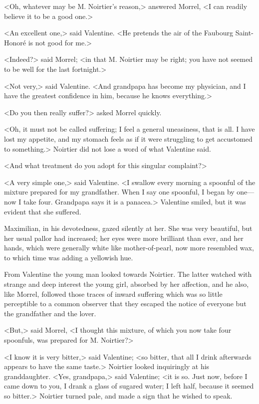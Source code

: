  <Oh, whatever may be M. Noirtier's reason,> answered Morrel, <I can readily believe it to be a good one.> 

 <An excellent one,> said Valentine. <He pretends the air of the Faubourg Saint-Honoré is not good for me.> 

 <Indeed?> said Morrel; <in that M. Noirtier may be right; you have not seemed to be well for the last fortnight.> 

 <Not very,> said Valentine. <And grandpapa has become my physician, and I have the greatest confidence in him, because he knows everything.> 

 <Do you then really suffer?> asked Morrel quickly. 

 <Oh, it must not be called suffering; I feel a general uneasiness, that is all. I have lost my appetite, and my stomach feels as if it were struggling to get accustomed to something.> Noirtier did not lose a word of what Valentine said. 

 <And what treatment do you adopt for this singular complaint?> 

 <A very simple one,> said Valentine. <I swallow every morning a spoonful of the mixture prepared for my grandfather. When I say one spoonful, I began by one—now I take four. Grandpapa says it is a panacea.> Valentine smiled, but it was evident that she suffered. 

 Maximilian, in his devotedness, gazed silently at her. She was very beautiful, but her usual pallor had increased; her eyes were more brilliant than ever, and her hands, which were generally white like mother-of-pearl, now more resembled wax, to which time was adding a yellowish hue. 

 From Valentine the young man looked towards Noirtier. The latter watched with strange and deep interest the young girl, absorbed by her affection, and he also, like Morrel, followed those traces of inward suffering which was so little perceptible to a common observer that they escaped the notice of everyone but the grandfather and the lover. 

 <But,> said Morrel, <I thought this mixture, of which you now take four spoonfuls, was prepared for M. Noirtier?> 

 <I know it is very bitter,> said Valentine; <so bitter, that all I drink afterwards appears to have the same taste.> Noirtier looked inquiringly at his granddaughter. <Yes, grandpapa,> said Valentine; <it is so. Just now, before I came down to you, I drank a glass of sugared water; I left half, because it seemed so bitter.> Noirtier turned pale, and made a sign that he wished to speak. 

